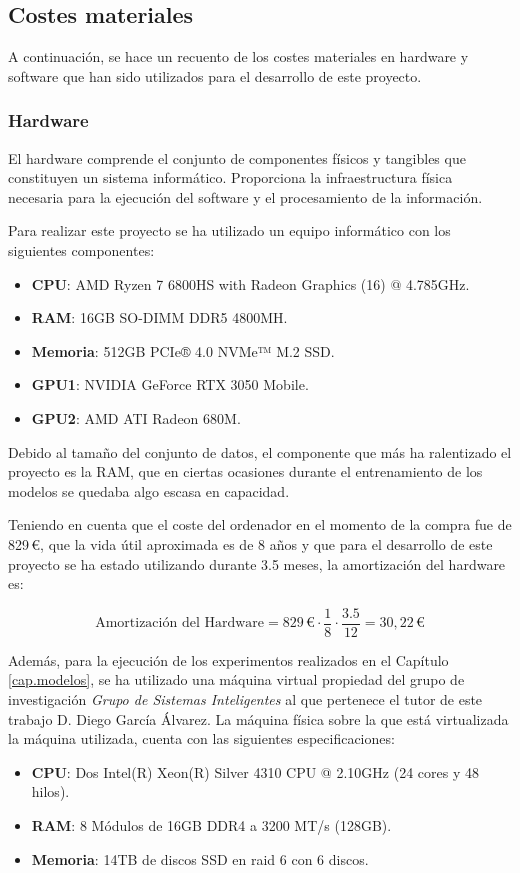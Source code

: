 \subsection{Costes materiales}
A continuación, se hace un recuento de los costes materiales en hardware y software que han sido utilizados para el desarrollo de este proyecto.
\subsubsection*{Hardware}
El hardware comprende el conjunto de componentes físicos y tangibles que constituyen un sistema informático. Proporciona la infraestructura física necesaria para la ejecución del software y el procesamiento de la información.

Para realizar este proyecto se ha utilizado un equipo informático con los siguientes componentes:
\begin{itemize}
\item \textbf{CPU}: AMD Ryzen 7 6800HS with Radeon Graphics (16) @ 4.785GHz.
\item \textbf{RAM}: 16GB SO-DIMM DDR5 4800MH.
\item \textbf{Memoria}: 512GB PCIe® 4.0 NVMe™ M.2 SSD.
\item \textbf{GPU1}: NVIDIA GeForce RTX 3050 Mobile.
\item \textbf{GPU2}: AMD ATI Radeon 680M.
\end{itemize}

Debido al tamaño del conjunto de datos, el componente que más ha ralentizado el proyecto es la RAM, que en ciertas ocasiones durante el entrenamiento de los modelos se quedaba algo escasa en capacidad.

Teniendo en cuenta que el coste del ordenador en el momento de la compra fue de 829\,€, que la vida útil aproximada es de 8 años y que para el desarrollo de este proyecto se ha estado utilizando durante 3.5 meses, la amortización del hardware es:

\begin{equation}
	\text{Amortización del Hardware} = 829\,\text{€} \cdot \frac{1}{8} \cdot \frac{3.5}{12} = 30,22\,\text{€}
\end{equation}


Además, para la ejecución de los experimentos realizados en el Capítulo \ref{cap.modelos}, se ha utilizado una máquina virtual propiedad del grupo de investigación \textit{Grupo de Sistemas Inteligentes} al que pertenece el tutor de este trabajo D. Diego García Álvarez. La máquina física sobre la que está virtualizada la máquina utilizada, cuenta con las siguientes especificaciones:
\begin{itemize}
\item \textbf{CPU}: Dos Intel(R) Xeon(R) Silver 4310 CPU @ 2.10GHz (24 cores y 48 hilos).
\item \textbf{RAM}: 8 Módulos de 16GB DDR4 a 3200 MT/s (128GB).
\item \textbf{Memoria}: 14TB de discos SSD en raid 6 con 6 discos.
\end{itemize}

